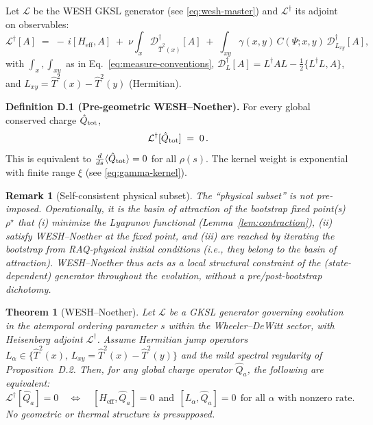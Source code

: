 \documentclass[12pt,a4paper]{article}
\newtheorem{remark}{Remark}[section]
\newtheorem{theorem}{Theorem}[section]
\numberwithin{equation}{section}
\begin{document}
\noindent Let $\mathcal L$ be the WESH GKSL generator (see \eqref{eq:wesh-master}) and $\mathcal L^\dagger$ its adjoint on observables:
\[
\mathcal L^\dagger[A] \;=\; -\,i[H_{\mathrm{eff}},A] \;+\; \nu\!\int_x\!\mathcal D^\dagger_{\hat T^2(x)}[A] \;+\; \int_{xy}\gamma(x,y)\,C(\Psi;x,y)\,\mathcal D^\dagger_{L_{xy}}[A],
\]
with $\int_x,\int_{xy}$ as in Eq.~\eqref{eq:measure-conventions}, $\mathcal D^\dagger_{L}[A]= L^\dagger A L - \tfrac12\{L^\dagger L, A\}$, and $L_{xy}=\hat T^2(x)-\hat T^2(y)$ (Hermitian).

\vspace{0.5cm}
\noindent\textbf{Definition D.1 (Pre-geometric WESH--Noether).}
For every global conserved charge $\hat Q_{\rm tot}$,
\begin{equation}
\mathcal L^\dagger[\hat Q_{\rm tot}] \;=\; 0 \,.
\label{eq:H-noether}
\end{equation}
This is equivalent to $\tfrac{d}{ds}\langle \hat Q_{\rm tot}\rangle=0$ for all $\rho(s)$. The kernel weight is exponential with finite range $\xi$ (see \eqref{eq:gamma-kernel}).

\begin{remark}[Self-consistent physical subset]
The “physical subset” is \emph{not} pre-imposed. Operationally, it is the basin of attraction of the bootstrap fixed point(s) $\rho^\star$ that (i) minimize the Lyapunov functional (Lemma~\ref{lem:contraction}), (ii) satisfy WESH--Noether at the fixed point, and (iii) are reached by iterating the bootstrap from RAQ-physical initial conditions (i.e., they belong to the basin of attraction).
WESH--Noether thus acts as a \emph{local structural constraint} of the (state-dependent) generator throughout the evolution, without a pre/post-bootstrap dichotomy.
\end{remark}

\begin{theorem}[WESH--Noether]
\label{thm:wesh-noether-pregeom}
Let $\mathcal L$ be a GKSL generator governing evolution in the atemporal ordering parameter $s$ within the Wheeler--DeWitt sector, with Heisenberg adjoint $\mathcal L^\dagger$. Assume Hermitian jump operators $L_\alpha \in \{\hat T^2(x),\,L_{xy}=\hat T^2(x)-\hat T^2(y)\}$ and the mild spectral regularity of Proposition~D.2. Then, for any global charge operator $\hat Q_a$, the following are equivalent:
\begin{equation*}
\mathcal L^\dagger[\hat Q_a]=0 
\quad\Longleftrightarrow\quad
[H_{\mathrm{eff}},\hat Q_a]=0\ \ \text{and}\ \ [L_\alpha,\hat Q_a]=0\ \ \text{for all }\alpha\text{ with nonzero rate}.
\end{equation*}
No geometric or thermal structure is presupposed.
\end{theorem}
\end{document}
